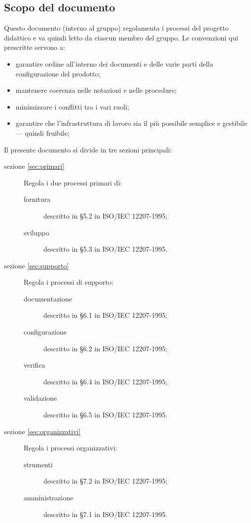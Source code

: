 	\subsection{Scopo del documento}
		Questo documento (interno al gruppo) regolamenta i processi del progetto didattico e va quindi letto da ciascun membro del gruppo. Le convenzioni qui prescritte servono a:
		\begin{itemize}
			\item garantire ordine all'interno dei documenti e delle varie parti della configurazione del prodotto;
			\item mantenere coerenza nelle notazioni e nelle procedure;
			\item minimizzare i conflitti tra i vari ruoli;
			\item garantire che l'infrastruttura di lavoro sia il più possibile semplice e gestibile --- quindi fruibile;
		\end{itemize}
		Il presente documento si divide in tre sezioni principali:
		\begin{description}
			\item[sezione \ref{sec:primari}] Regola i due processi primari di:
			\begin{description}
				\item[fornitura] descritto in §5.2 in ISO/IEC 12207-1995;
				\item[sviluppo] descritto in §5.3 in ISO/IEC 12207-1995.
			\end{description}
			\item[sezione \ref{sec:supporto}] Regola i processi di supporto:
			\begin{description}
				\item[documentazione] descritto in §6.1 in ISO/IEC 12207-1995;
				\item[configurazione] descritto in §6.2 in ISO/IEC 12207-1995;
				\item[verifica] descritto in §6.4 in ISO/IEC 12207-1995;
				\item[validazione] descritto in §6.5 in ISO/IEC 12207-1995.
			\end{description}
			\item[sezione \ref{sec:organizzativi}] Regola i processi organizzativi:
			\begin{description}
				\item[strumenti] descritto in §7.2 in ISO/IEC 12207-1995;
				\item[amministrazione] descritto in §7.1 in ISO/IEC 12207-1995.
			\end{description}
		\end{description}
		
